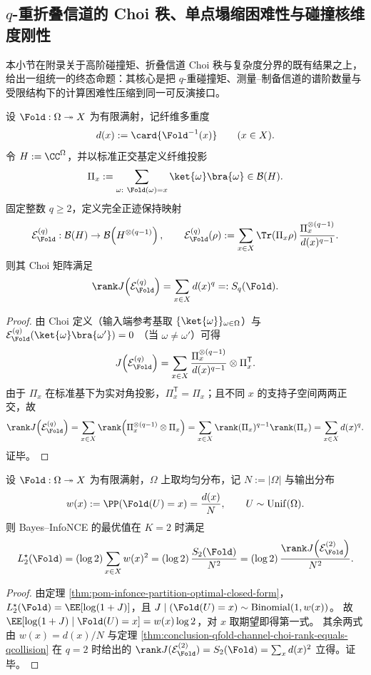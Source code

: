 \subsection{\texorpdfstring{$q$}{q}-重折叠信道的 Choi 秩、单点塌缩困难性与碰撞核维度刚性}\label{subsec:conclusion-qcollision-choi-rank-sharpp-kernel-dimension-pdet}
本小节在附录关于高阶碰撞矩、折叠信道 Choi 秩与复杂度分界的既有结果之上，给出一组统一的终态命题：其核心是把 \(q\)-重碰撞矩、测量--制备信道的谱阶数量与受限结构下的计算困难性压缩到同一可反演接口。

\begin{theorem}\label{thm:conclusion-qfold-channel-choi-rank-equals-qcollision}
设 \(\Fold:\Omega\twoheadrightarrow X\) 为有限满射，记纤维多重度
\[
d(x):=\card{\Fold^{-1}(x)}\qquad(x\in X).
\]
令 \(H:=\CC^\Omega\)，并以标准正交基定义纤维投影
\[
\Pi_x:=\sum_{\omega:\ \Fold(\omega)=x}\ket{\omega}\bra{\omega}\in\mathcal B(H).
\]
固定整数 \(q\ge 2\)，定义完全正迹保持映射
\[
\mathcal E_{\Fold}^{(q)}:\mathcal B(H)\to\mathcal B\!\left(H^{\otimes(q-1)}\right),\qquad
\mathcal E_{\Fold}^{(q)}(\rho):=\sum_{x\in X}\Tr(\Pi_x\rho)\,\frac{\Pi_x^{\otimes(q-1)}}{d(x)^{q-1}}.
\]
则其 Choi 矩阵满足
\[
\rank J\!\left(\mathcal E_{\Fold}^{(q)}\right)=\sum_{x\in X}d(x)^q=:S_q(\Fold).
\]
\end{theorem}
\begin{proof}
由 Choi 定义（输入端参考基取 \(\{\ket{\omega}\}_{\omega\in\Omega}\)）与
\(
\mathcal E_{\Fold}^{(q)}(\ket{\omega}\bra{\omega'})
=0
\)
（当 \(\omega\neq\omega'\)）可得
\[
J\!\left(\mathcal E_{\Fold}^{(q)}\right)
=
\sum_{x\in X}\frac{\Pi_x^{\otimes(q-1)}}{d(x)^{q-1}}\otimes \Pi_x^{\mathsf T}.
\]
由于 \(\Pi_x\) 在标准基下为实对角投影，\(\Pi_x^{\mathsf T}=\Pi_x\)；且不同 \(x\) 的支持子空间两两正交，故
\[
\rank J\!\left(\mathcal E_{\Fold}^{(q)}\right)
=\sum_{x\in X}\rank\!\left(\Pi_x^{\otimes(q-1)}\otimes\Pi_x\right)
=\sum_{x\in X}\rank(\Pi_x)^{q-1}\rank(\Pi_x)
=\sum_{x\in X}d(x)^q.
\]
证毕。
\end{proof}

\begin{corollary}[Bayes--InfoNCE 在 \texorpdfstring{$K=2$}{K=2} 时等价于二次碰撞矩与 Choi 秩]\label{cor:conclusion-bayes-infonce2-equals-qcollision2-choi-rank}
设 \(\Fold:\Omega\twoheadrightarrow X\) 为有限满射，\(\Omega\) 上取均匀分布，记 \(N:=|\Omega|\) 与输出分布
\[
w(x):=\PP(\Fold(U)=x)=\frac{d(x)}{N},\qquad U\sim\mathrm{Unif}(\Omega).
\]
则 Bayes--InfoNCE 的最优值在 \(K=2\) 时满足
\[
L_2^\star(\Fold)
=(\log 2)\sum_{x\in X}w(x)^2
=(\log 2)\,\frac{S_2(\Fold)}{N^2}
=(\log 2)\,\frac{\rank J\!\left(\mathcal E_{\Fold}^{(2)}\right)}{N^2}.
\]
\end{corollary}
\begin{proof}
由定理 \ref{thm:pom-infonce-partition-optimal-closed-form}，\(L_2^\star(\Fold)=\EE[\log(1+J)]\)，且
\(
J\mid(\Fold(U)=x)\sim\mathrm{Binomial}(1,w(x))
\)。
故
\(
\EE[\log(1+J)\mid \Fold(U)=x]=w(x)\log 2
\)，对 \(x\) 取期望即得第一式。
其余两式由 \(w(x)=d(x)/N\) 与定理 \ref{thm:conclusion-qfold-channel-choi-rank-equals-qcollision} 在 \(q=2\) 时给出的
\(
\rank J(\mathcal E_{\Fold}^{(2)})=S_2(\Fold)=\sum_x d(x)^2
\)
立得。证毕。
\end{proof}

